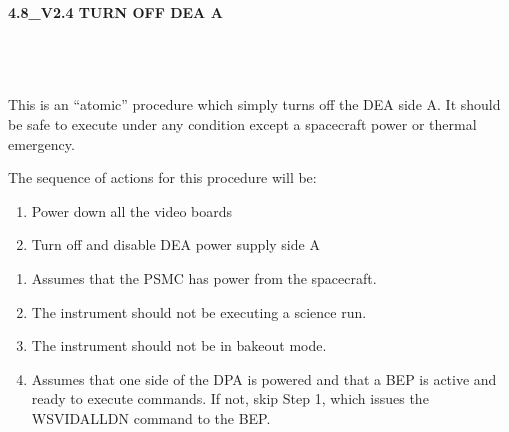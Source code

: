\documentclass[11pt]{article}
\begin{document}
%
%
%
\newcommand{\be}{\begin{enumerate}}
\newcommand{\ee}{\end{enumerate}}
\newcommand{\bc}{\begin{center}}
\newcommand{\ec}{\end{center}}
\newcommand{\bi}{\begin{itemize}}
\newcommand{\ei}{\end{itemize}}
\newcommand{\bd}{\begin{description}}
\newcommand{\ed}{\end{description}}
\newcommand{\bt}{\begin{tabbing}}
\newcommand{\et}{\end{tabbing}}
\newcommand{\eg}{{\it e.g.~}}
\newcommand{\ie}{{\it i.e.~}}
\newcommand{\ul}{\underline}
\newcommand{\axaf}{{\em AXAF}}
\def\la{\hbox{\rlap{$<$}\lower0.5ex\hbox{$\sim$}\ }}


\large
\centerline {\bf 4.8\_V2.4 TURN OFF DEA A}
\vspace{0.25in}

\normalsize
{}\\
 \\

 \\
\normalsize
This is an ``atomic'' procedure which simply turns off the DEA side A.
It should be safe to execute under any condition except a spacecraft 
power or thermal emergency.

\vspace{0.25in}
\noindent The sequence of actions for this procedure will be:
\be
\item Power down all the video boards
\vspace{-0.10in}
\item Turn off and disable DEA power supply side A
\ee

\vspace{0.15in}
\normalsize
{}
\normalsize
\be
\item Assumes that the PSMC has power from the spacecraft.
\vspace{-0.10in}
\item The instrument should not be executing a science run.
\vspace{-0.10in}
\item The instrument should not be in bakeout mode.
\vspace{-0.10in}
\item Assumes that one side of the DPA is powered and that 
a BEP is active and ready to execute commands. If not, skip 
Step 1, which issues the WSVIDALLDN command to the BEP.
\ee
\vspace{0.1in}
\normalsize
{} \\
\normalsize
\end{document}

